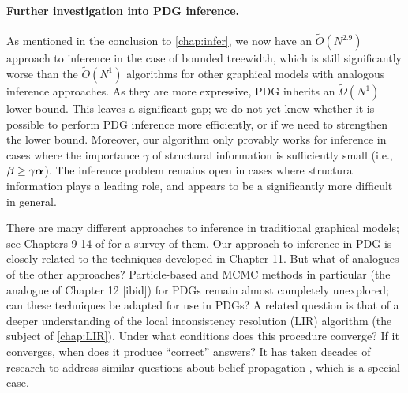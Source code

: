 \paragraph{Further investigation into PDG inference.}
As mentioned in the conclusion to \cref{chap:infer}, we now have an $\tilde O(N^{2.9})$ approach to inference in the case of bounded treewidth,
which is still significantly worse than the $\tilde O(N^1)$ algorithms for other graphical models with analogous inference approaches.
As they are more expressive, PDG inherits an $\tilde \Omega(N^1)$ lower bound.
This leaves a significant gap;
we do not yet know whether it is possible to perform PDG inference more efficiently, or if we need to strengthen the lower bound. 
Moreover, our algorithm only provably works for inference in cases where 
    the importance $\gamma$ of structural information is sufficiently small
        (i.e., $\boldsymbol\beta \ge \gamma\boldsymbol\alpha$). 
The inference problem remains open in cases where structural information plays a leading role, and appears to be a significantly more difficult in general. 

There are many different approaches to inference in traditional graphical models;
see Chapters 9-14 of \citet{KF09} for a survey of them.
Our approach to inference in PDG is closely related to the techniques developed in Chapter 11. But what of analogues of the other approaches? 
Particle-based and MCMC methods in particular (the analogue of Chapter 12 [ibid])
for PDGs remain almost completely unexplored; can these techniques be adapted for use in PDGs?
%    
%
A related question is that of a deeper understanding of the local inconsistency resolution (LIR) algorithm (the subject of \cref{chap:LIR}). 
Under what conditions does this procedure converge?
If it converges, when does it produce ``correct'' answers?
It has taken decades of research to address similar questions about belief propagation \citep{yedida-genbp,wiegerinck-fracbp,minka2005divergence}, which is a special case.


